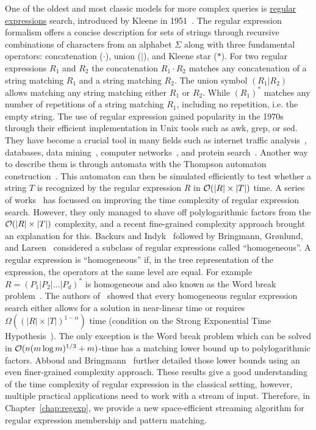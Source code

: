 One of the oldest and most classic models for more complex queries is \ul{regular expressions} search, introduced by Kleene in 1951~\cite{RM-704}.
The regular expression formalism offers a concise description for sets of strings through recursive combinations of characters from an alphabet $\Sigma$ along with three fundamental operators: concatenation ($\cdot$), union ($|$), and Kleene star ($\ast$).
For two regular expressions $R_1$ and $R_2$ the concatenation $R_1\cdot R_2$ matches any concatenation of a string matching $R_1$ and a string matching $R_2$. The union symbol $(R_1|R_2)$ allows matching any string matching either $R_1$ or $R_2$. While $(R_1)^\ast$ matches any number of repetitions of a string matching $R_1$, including no repetition, i.e. the empty string.
The use of regular expression gained popularity in the 1970s through their efficient implementation in Unix tools such as awk, grep, or sed.
They have become a crucial tool in many fields such as internet traffic analysis~\cite{4221791,4579527}, databases, data mining~\cite{1000341,10.5555/645927.672035,10.1145/375551.375569}, computer networks~\cite{10.1145/1159913.1159952}, and protein search~\cite{10.1145/369133.369220}.
Another way to describe them is through automata with the Thompson automaton construction~\cite{Thompson_automaton}. This automaton can then be simulated efficiently to test whether a string $T$ is recognized by the regular expression $R$ in $\mathcal{O}(|R| \times |T|)$ time.
A series of works~\cite{10.1145/128749.128755,BILLE2008486,10.1007/978-3-642-02927-1_16,10.1007/11786986_56,doi:10.1137/1.9781611973075.104} has focussed on improving the time complexity of regular expression search. However, they only managed to shave off polylogarithmic factors from the $\mathcal{O}(|R| \times |T|)$ complexity, and a recent fine-grained complexity approach brought an explanation for this.
Backurs and Indyk~\cite{DBLP:conf/focs/BackursI16} followed by Bringmann, Gr{\o}nlund, and Larsen~\cite{8104068} considered a subclass of regular expressions called ``homogeneous''. A regular expression is ``homogeneous'' if, in the tree representation of the expression, the operators at the same level are equal. For example $R=(P_1|P_2|...|P_d)^\ast$ is homogeneous and also known as the Word break problem~\cite{wordbreak1,wordbreak2}. The authors of~\cite{DBLP:conf/focs/BackursI16,8104068} showed that every homogeneous regular expression search either allows for a solution in near-linear time or requires $\Omega((|R| \times |T|)^{1-\alpha})$ time (condition on the Strong Exponential Time Hypothesis~\cite{IMPAGLIAZZO2001367}). The only exception is the Word break problem which can be solved in $\mathcal{O}(n (m \log m)^{1/3}+m)$-time has a matching lower bound up to polylogarithmic factors. Abboud and Bringmann~\cite{DBLP:conf/icalp/AbboudB18} further detailed those lower bounds using an even finer-grained complexity approach.
These results give a good understanding of the time complexity of regular expression in the classical setting, however, multiple practical applications need to work with a stream of input. Therefore, in Chapter~\ref{chap:regexp}, we provide a new space-efficient streaming algorithm for regular expression membership and pattern matching.


